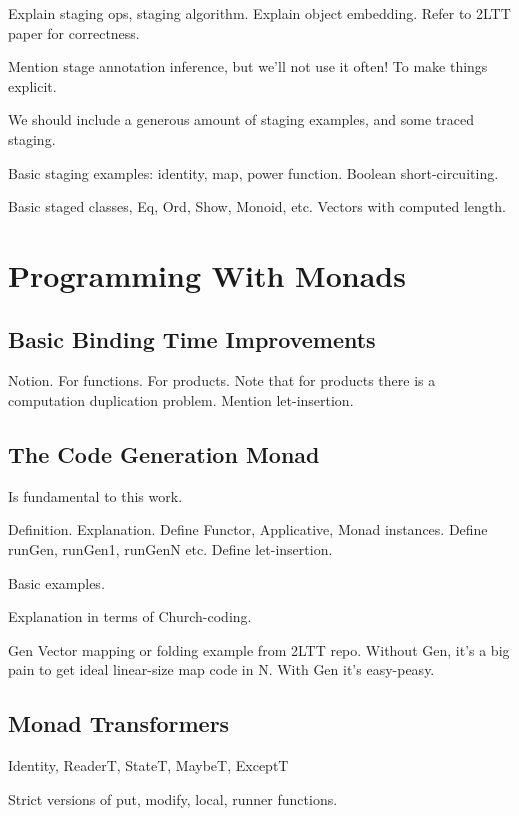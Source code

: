 \documentclass[acmsmall,screen,review,anonymous]{acmart}
\theoremstyle{remark}
\begin{document}
Explain staging ops, staging algorithm. Explain object embedding. Refer to 2LTT
paper for correctness.

Mention stage annotation inference, but we'll not use it often! To make things
explicit.

We should include a generous amount of staging examples, and some traced staging.

Basic staging examples: identity, map, power function. Boolean short-circuiting.

Basic staged classes, Eq, Ord, Show, Monoid, etc. Vectors with computed length.

\section{Programming With Monads}\label{sec:programming-with-monads}

\subsection{Basic Binding Time Improvements}\label{sec:basic-binding-time-improvements}

Notion.
For functions.
For products.
Note that for products there is a computation duplication problem.
Mention let-insertion.

\subsection{The Code Generation Monad}\label{sec:the-code-generation-monad}

Is fundamental to this work.

Definition. Explanation. Define Functor, Applicative, Monad instances.
Define runGen, runGen1, runGenN etc. Define let-insertion.

Basic examples.

Explanation in terms of Church-coding.

Gen Vector mapping or folding example from 2LTT repo. Without Gen, it's a
big pain to get ideal linear-size map code in N. With Gen it's easy-peasy.

\subsection{Monad Transformers}\label{sec:monad-transformers}

Identity, ReaderT, StateT, MaybeT, ExceptT

Strict versions of put, modify, local, runner functions.
\end{document}
